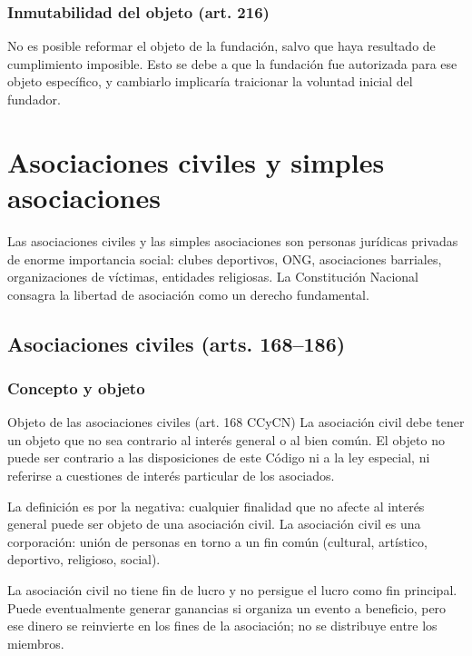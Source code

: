 \documentclass[12pt,oneside]{book}
\begin{document}
\subsection{Inmutabilidad del objeto (art. 216)}

No es posible reformar el objeto de la fundación, salvo que haya resultado de cumplimiento imposible. Esto se debe a que la fundación fue autorizada para ese objeto específico, y cambiarlo implicaría traicionar la voluntad inicial del fundador.

\chapter{Asociaciones civiles y simples asociaciones}

Las asociaciones civiles y las simples asociaciones son personas jurídicas privadas de enorme importancia social: clubes deportivos, ONG, asociaciones barriales, organizaciones de víctimas, entidades religiosas. La Constitución Nacional consagra la libertad de asociación como un derecho fundamental.

\section{Asociaciones civiles (arts. 168--186)}

\subsection{Concepto y objeto}

\begin{definition}{Objeto de las asociaciones civiles (art. 168 CCyCN)}
La asociación civil debe tener un objeto que no sea contrario al interés general o al bien común. El objeto no puede ser contrario a las disposiciones de este Código ni a la ley especial, ni referirse a cuestiones de interés particular de los asociados.
\end{definition}

La definición es por la negativa: cualquier finalidad que no afecte al interés general puede ser objeto de una asociación civil. La asociación civil es una corporación: unión de personas en torno a un fin común (cultural, artístico, deportivo, religioso, social).

\begin{important}
La asociación civil no tiene fin de lucro y no persigue el lucro como fin principal. Puede eventualmente generar ganancias si organiza un evento a beneficio, pero ese dinero se reinvierte en los fines de la asociación; no se distribuye entre los miembros.
\end{important}
\end{document}
